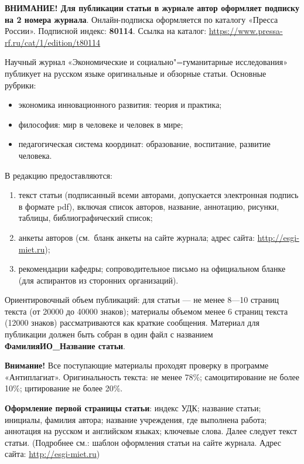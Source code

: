 \begin{multicols}{2}


    \textbf{ВНИМАНИЕ! Для публикации статьи
    в журнале автор оформляет подписку на
    2 номера журнала}. Онлайн-подписка оформляется по каталогу «Пресса России». Подписной индекс: \textbf{80114}. Ссылка на каталог:
    \url{https://www.pressa-rf.ru/cat/1/edition/t80114}

    Научный журнал «Экономические и социально"=гуманитарные исследования» публикует на русском языке оригинальные и обзорные статьи. Основные рубрики:
\begin{itemize}
    \item  экономика инновационного развития:
    теория и практика;
    \item  философия: мир в человеке и человек
    в мире;
    \item  педагогическая система координат: образование, воспитание, развитие человека.
\end{itemize}    

    В редакцию предоставляются:
\begin{enumerate}
    \item текст статьи (подписанный всеми авторами, допускается электронная подпись
    в формате pdf), включая список авторов, название, аннотацию, рисунки, таблицы, библиографический список;
    \item  анкеты авторов (см. бланк анкеты на
    сайте журнала; адрес сайта: \url{http://esgi-miet.ru});
    \item  рекомендации кафедры; сопроводительное письмо на официальном бланке
    (для аспирантов из сторонних организаций).
\end{enumerate}
    Ориентировочный объем публикаций: для
    статьи — не менее 8—10 страниц текста
    (от \num{20000} до \num{40000} знаков); материалы объемом менее 6 страниц текста (\num{12000} знаков)
    рассматриваются как краткие сообщения.
    Материал для публикации должен быть
    собран в один файл с названием \textbf{ФамилияИО\_Название статьи}.

    \textbf{Внимание!} Все поступающие материалы
    проходят проверку в программе «Антиплагиат». Оригинальность текста: не менее 78\%;
    самоцитирование не более 10\%; цитирование не более 20\%.

    \textbf{Оформление первой страницы статьи}:
    индекс УДК; название статьи; инициалы,
    фамилия автора; название учреждения, где
    выполнена работа; аннотация на русском
    и английском языках; ключевые слова. Далее
    следует текст статьи. (Подробнее см.: шаблон
    оформления статьи на сайте журнала. Адрес
    сайта: \url{http://esgi-miet.ru})
    

\end{multicols}
